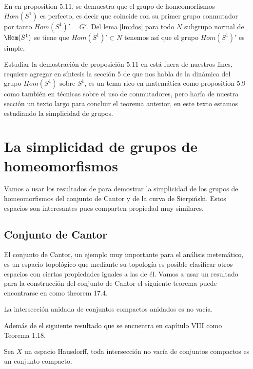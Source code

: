  
 En \cite{ander} en proposition 5.11, se demuestra que el grupo de homeomorfismos $Hom(S^1)$ es perfecto, es decir que coincide con su primer grupo conmutador por tanto $Hom(S^1)'=G'$. Del lema \ref{lm:dos} para todo $N$ subgrupo normal de $\Hom(S^1)$ se tiene que $Hom(S^1)' \subset N$ tenemos así que el grupo $Hom(S^1)'$ es simple.  
 
 
 \begin{cn}
 Estudiar la demostración de proposición 5.11
 en  \cite{ander} está fuera de nuestros fines, requiere agregar en síntesis la sección 5 de \cite{ander} que nos habla de la dinámica del grupo $Hom(S^1)$ sobre $S^1$, es un tema rico en matemática como proposition 5.9 como también en técnicas sobre el uso de conmutadores, pero haría de nuestra sección un texto largo para concluir el teorema anterior, en este texto estamos estudiando la simplicidad de grupos.
\end{cn}



\chapter*{La simplicidad de grupos de homeomorfismos}
Vamos a usar los resultados de \cite{ander} para demostrar la simplicidad de los grupos de homeomorfismos del conjunto de Cantor y de la curva de Sierpiński. Estos espacios son interesantes pues comparten propiedad muy similares. 

\section*{Conjunto de Cantor}
El conjunto de Cantor, un ejemplo muy importante para el análisis metemático, es un espacio topológico que mediante su topología es posible clasificar otros espacios con ciertas  propiedades iguales a las de él. Vamos a usar un resultado para la construcción del conjunto de Cantor el siguiente teorema puede encontrarse en \cite{top_willd} como theorem 17.4.

\begin{te}
La intersección anidada de conjuntos compactos anidados es no vacía. 
\end{te}
Además de el siguiente resultado que se encuentra en \cite{top_prieto} capítulo VIII como Teorema 1.18.
 
 \begin{te}
 Sea $X$ un espacio Hausdorff, toda intersección no vacía de conjuntos compactos es un conjunto compacto. 
 \end{te}
 
